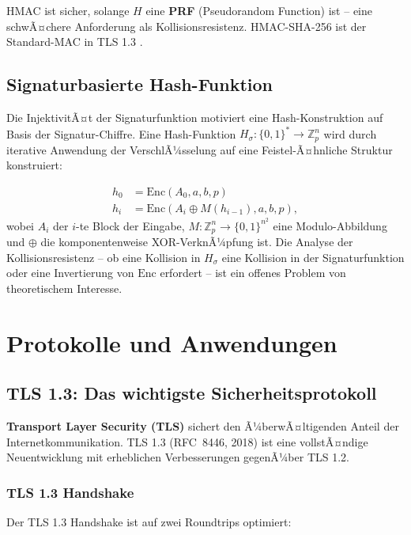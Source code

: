 ﻿\documentclass[a4paper,12pt]{scrreprt}
\theoremstyle{definition}
\begin{document}
HMAC ist sicher, solange $H$ eine \textbf{PRF} (Pseudorandom Function) ist -- eine schwÃ¤chere Anforderung als Kollisionsresistenz. HMAC-SHA-256 ist der Standard-MAC in TLS 1.3 \cite{Res18}.

\subsection{Signaturbasierte Hash-Funktion}

Die InjektivitÃ¤t der Signaturfunktion motiviert eine Hash-Konstruktion auf Basis der Signatur-Chiffre. Eine Hash-Funktion $H_\sigma: \{0,1\}^* \to \mathbb{Z}_p^n$ wird durch iterative Anwendung der VerschlÃ¼sselung auf eine Feistel-Ã¤hnliche Struktur konstruiert:

\begin{align*}
h_0 &= \mathrm{Enc}(A_0, a, b, p) \\
h_i &= \mathrm{Enc}(A_i \oplus M(h_{i-1}), a, b, p),
\end{align*}
wobei $A_i$ der $i$-te Block der Eingabe, $M: \mathbb{Z}_p^n \to \{0,1\}^{n^2}$ eine Modulo-Abbildung und $\oplus$ die komponentenweise XOR-VerknÃ¼pfung ist. Die Analyse der Kollisionsresistenz -- ob eine Kollision in $H_\sigma$ eine Kollision in der Signaturfunktion oder eine Invertierung von $\mathrm{Enc}$ erfordert -- ist ein offenes Problem von theoretischem Interesse.

\section{Protokolle und Anwendungen}

\subsection{TLS 1.3: Das wichtigste Sicherheitsprotokoll}

\textbf{Transport Layer Security (TLS)} \cite{Res18} sichert den Ã¼berwÃ¤ltigenden Anteil der Internetkommunikation. TLS 1.3 (RFC~8446, 2018) ist eine vollstÃ¤ndige Neuentwicklung mit erheblichen Verbesserungen gegenÃ¼ber TLS 1.2.

\subsubsection{TLS 1.3 Handshake}

Der TLS 1.3 Handshake ist auf zwei Roundtrips optimiert:
\end{document}
